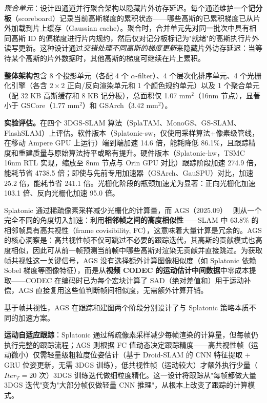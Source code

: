 \emph{聚合单元}：设计四通道并行聚合架构以隐藏片外访存延迟。每个通道维护一个\textbf{记分板}（scoreboard）记录当前高斯梯度的累积状态——哪些高斯的已累积梯度已从片外加载到片上缓存（Gaussian cache）。聚合时，合并单元先对同一批次中具有相同高斯 ID 的偏梯度进行片内规约，然后仅对记分板标记为"就绪"的高斯执行片外读写更新。这种设计通过\emph{交错处理不同高斯的梯度更新}来隐藏片外访存延迟：当等待某个高斯的片外数据时，其他高斯的梯度可继续在片上累积。

\textbf{整体架构}包含 8 个投影单元（各配 4 个 $\alpha$-filter）、4 个层次化排序单元、4 个光栅化引擎（各含 $2\times 2$ 正向/反向渲染单元和 1 个颜色规约单元）以及 1 个聚合单元（配 32 KB 高斯缓存和 8 KB 记分板），总面积仅 1.07 mm$^2$（16nm 节点），显著小于 GSCore（1.77 mm$^2$）和 GSArch（3.42 mm$^2$）。

\textbf{实验评估。}在四个 3DGS-SLAM 算法（SplaTAM、MonoGS、GS-SLAM、FlashSLAM）上评估。软件版本（Splatonic-sw，仅使用采样算法+像素级管线，在移动 Ampere GPU 上运行）端到端加速 14.6 倍，能耗降低 86.1\%，且跟踪精度和重建质量与原始算法持平或略有提升。硬件版本（Splatonic-hw，TSMC 16nm RTL 实现，缩放至 8nm 节点与 Orin GPU 对比）跟踪阶段加速 274.9 倍，能耗节省 4738.5 倍；即使与先前专用加速器（GSArch、GauSPU）对比，加速 25.2 倍，能耗节省 241.1 倍。光栅化阶段的瓶颈加速尤为显著：正向光栅化加速 103.1 倍、反向光栅化加速 95.0 倍。

Splatonic 通过稀疏像素采样减少光栅化的计算量，而 AGS（2025.09）~\cite{2509_00433} 则从一个完全不同的角度切入加速：利用\textbf{相邻帧之间的高度相似性}——SLAM 中 $63.8\%$ 的相邻帧具有高共视性（frame covisibility, FC），这意味着大量计算是冗余的。AGS 的核心洞察是：高共视性帧不仅可跳过不必要的跟踪迭代，其高斯的贡献模式也高度相似，因此可从前一帧预测当前帧中哪些高斯对渲染无贡献并直接跳过。为获取帧共视性这一关键信号，AGS 没有选择额外计算图像相似度（如 Splatonic 依赖 Sobel 梯度等图像特征），而是从\textbf{视频 CODEC 的运动估计中间数据}中零成本提取——CODEC 在编码时已为每个宏块计算了 SAD（绝对差值和）用于运动补偿，AGS 直接复用这些值判断帧间相似度，无需额外计算开销。

基于帧共视性，AGS 在跟踪和建图两个阶段分别设计了与 Splatonic 策略本质不同的加速方案。

\textbf{运动自适应跟踪}：Splatonic 通过稀疏像素采样减少每帧渲染的计算量，但每帧仍执行完整的跟踪流程；AGS 则根据 FC 值动态决定跟踪精度——高共视性帧（运动微小）仅需轻量级粗粒度位姿估计（基于 Droid-SLAM 的 CNN 特征提取 + GRU 位姿更新，无需 3DGS 训练），低共视性帧（运动较大）才额外执行少量（$Iter_T = 20$ 次）3DGS 训练迭代做细粒度精化。这一设计将跟踪从"每帧都做大量 3DGS 迭代"变为"大部分帧仅做轻量 CNN 推理"，从根本上改变了跟踪的计算模式。

